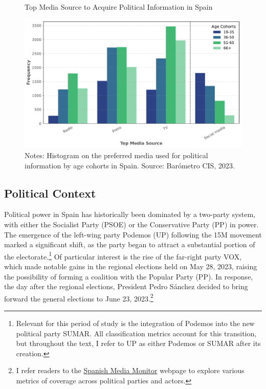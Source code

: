 \documentclass[12pt]{article}
\begin{document}
	\begin{figure}[ht!]
		\centering
		\caption{Top Media Source to Acquire Political Information in Spain}
		\includegraphics[width=120mm]{figures/age_cohorts}
\caption*{\small Notes: Histogram on the preferred media used for political information by age cohorts in Spain.  
	Source: Barómetro CIS, 2023. }
\label{fig:motivation}
	\end{figure}
	
	

	
	
	\subsection*{Political Context}
	
	Political power in Spain has historically been dominated by a two-party system, with either the Socialist Party (PSOE) or the Conservative Party (PP) in power. The emergence of the left-wing party Podemos (UP) following the 15M movement marked a significant shift, as the party began to attract a substantial portion of the electorate.\footnote{Relevant for this period of study is the integration of Podemos into the new political party SUMAR. All classification metrics account for this transition, but throughout the text, I refer to UP as either Podemos or SUMAR after its creation.} Of particular interest is the rise of the far-right party VOX, which made notable gains in the regional elections held on May 28, 2023, raising the possibility of forming a coalition with the Popular Party (PP). In response, the day after the regional elections, President Pedro Sánchez decided to bring forward the general elections to June 23, 2023.\footnote{I refer readers to the \href{https://luisignaciomenendez.github.io/media_monitor/index.html}{Spanish Media Monitor} webpage to explore various metrics of coverage across political parties and actors.} 
	
\end{document}
